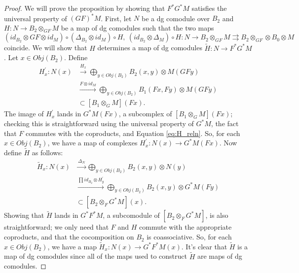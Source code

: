 \begin{proof}
We will prove the proposition by showing that 
$F^*G^*M$ satisfies the universal property of 
$(GF)^*M$. First, let $N$ be a dg comodule over $B_2$ 
and $H: N \to B_2 \otimes_{GF} M$ be a map of 
dg comodules such that the two maps 
\begin{equation}\label{eq:H_reln}
(id_{B_2} \otimes GF \otimes id_M) \circ 
(\Delta_{B_2}\otimes id_M) \circ H, \>
(id_{B_2} \otimes \Delta_M) \circ H: 
N \to B_2 \otimes_{GF} M
\rightrightarrows 
B_2 \otimes_{GF} \otimes B_0 \otimes M
\end{equation}
coincide. We will show that $H$ determines a 
map of dg comodules $\tilde{H}: N \to F^*G^*M$. 
Let $x \in Obj(B_2)$. Define 
\begin{align*}
H^\prime_x: N(x)
&\xrightarrow{H_x}
\bigoplus \limits_{y \in Obj(B_2)}
  B_2(x,y) \otimes M(GFy)\\
&\xrightarrow{F \otimes id_M}
\bigoplus \limits_{y \in Obj(B_2)}
  B_1(Fx,Fy) \otimes M(GFy)\\
&\subset
[B_1 \otimes_G M](Fx).  
\end{align*}
The image of $H^\prime_x$ lands in 
$G^*M(Fx)$, a subcomplex of 
$[B_1 \otimes_G M](Fx)$; checking 
this is straightforward using the 
universal property of $G^*M$, the 
fact that $F$ commutes with the 
coproducts, and Equation \ref{eq:H_reln}. 
So, for 
each $x \in Obj(B_2)$, we have a map  
of complexes $H^\prime_x: N(x) \to 
G^*M(Fx)$. Now define $\tilde{H}$ as 
follows:
\begin{align*}
\tilde{H}_x: N(x) 
&\xrightarrow{\Delta_N}
\bigoplus \limits_{y \in Obj(B_2)}
  B_2(x,y) \otimes N(y)\\
&\xrightarrow{\prod id_{B_2} \otimes H^\prime_y}  
\bigoplus \limits_{y \in Obj(B_2)}
  B_2(x,y) \otimes G^*M(Fy)\\
&\subset
[B_2 \otimes_F G^*M](x).
\end{align*}
Showing that $\tilde{H}$ lands in 
$G^*F^*M$, a subcomodule of 
$[B_2 \otimes_F G^*M]$, is also 
straightforward; we only need that 
$F$ and $H$ commute with the appropriate 
coproducts, and that the cocomposition 
on $B_2$ is coassociative. So, for each 
$x \in Obj(B_2)$, we have a map 
$\tilde{H}_x: N(x) \to G^*F^*M(x)$. 
It's clear that $\tilde{H}$ is a map 
of dg comodules since all of the maps 
used to construct $\tilde{H}$ are maps 
of dg comodules.


\end{proof}

